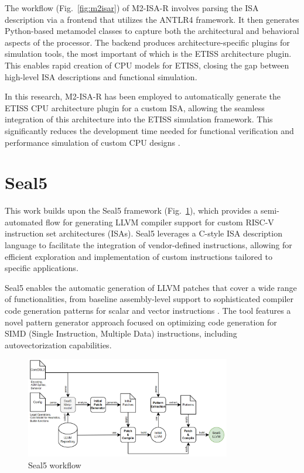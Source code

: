 The workflow (Fig.~\ref{fig:m2isar}) of M2-ISA-R involves parsing the ISA description via a frontend that utilizes the ANTLR4 framework. It then generates Python-based metamodel classes to capture both the architectural and behavioral aspects of the processor. The backend produces architecture-specific plugins for simulation tools, the most important of which is the ETISS architecture plugin. This enables rapid creation of CPU models for ETISS, closing the gap between high-level ISA descriptions and functional simulation.

In this research, M2-ISA-R has been employed to automatically generate the ETISS CPU architecture plugin for a custom ISA, allowing the seamless integration of this architecture into the ETISS simulation framework. This significantly reduces the development time needed for functional verification and performance simulation of custom CPU designs \cite{RISCVSimulation}.

\section{Seal5}

This work builds upon the Seal5 framework (Fig.~\ref{fig:seal5}), which provides a semi-automated flow for generating LLVM compiler support for custom RISC-V instruction set architectures (ISAs). Seal5 leverages a C-style ISA description language to facilitate the integration of vendor-defined instructions, allowing for efficient exploration and implementation of custom instructions tailored to specific applications.

Seal5 enables the automatic generation of LLVM patches that cover a wide range of functionalities, from baseline assembly-level support to sophisticated compiler code generation patterns for scalar and vector instructions . The tool features a novel pattern generator approach focused on optimizing code generation for SIMD (Single Instruction, Multiple Data) instructions, including autovectorization capabilities.

\begin{figure}
    \centering
    \includegraphics[width=0.8\textwidth]{figures/seal5.png}
    \caption{Seal5 workflow \cite{Seal5}}
    \label{fig:seal5}
\end{figure}

